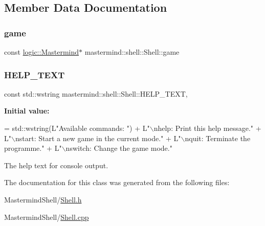 \subsection{Member Data Documentation}
\hypertarget{classmastermind_1_1shell_1_1_shell_a12f951c05bb022b96f380cfb88a98e15}{}\label{classmastermind_1_1shell_1_1_shell_a12f951c05bb022b96f380cfb88a98e15} 
\subsubsection{\texorpdfstring{game}{game}}
{\footnotesize\ttfamily const \hyperlink{classmastermind_1_1logic_1_1_mastermind}{logic\+::\+Mastermind}$\ast$ mastermind\+::shell\+::\+Shell\+::game\hspace{0.3cm}{\ttfamily [private]}}

\hypertarget{classmastermind_1_1shell_1_1_shell_aace07f09e5898a12bdb7ce9dac2ade13}{}\label{classmastermind_1_1shell_1_1_shell_aace07f09e5898a12bdb7ce9dac2ade13} 
\subsubsection{\texorpdfstring{H\+E\+L\+P\+\_\+\+T\+E\+XT}{HELP\_TEXT}}
{\footnotesize\ttfamily const std\+::wstring mastermind\+::shell\+::\+Shell\+::\+H\+E\+L\+P\+\_\+\+T\+E\+XT\hspace{0.3cm}{\ttfamily [static]}, {\ttfamily [private]}}

{\bfseries Initial value\+:}
\begin{DoxyCode}
= std::wstring(L\textcolor{stringliteral}{"Available commands: "})
            + L\textcolor{stringliteral}{"\(\backslash\)nhelp: Print this help message."}
            + L\textcolor{stringliteral}{"\(\backslash\)nstart: Start a new game in the current mode."}
            + L\textcolor{stringliteral}{"\(\backslash\)nquit: Terminate the programme."}
            + L\textcolor{stringliteral}{"\(\backslash\)nswitch: Change the game mode."}
\end{DoxyCode}


The help text for console output. 



The documentation for this class was generated from the following files\+:\begin{DoxyCompactItemize}
\item 
Mastermind\+Shell/\hyperlink{_shell_8h}{Shell.\+h}\item 
Mastermind\+Shell/\hyperlink{_shell_8cpp}{Shell.\+cpp}\end{DoxyCompactItemize}
